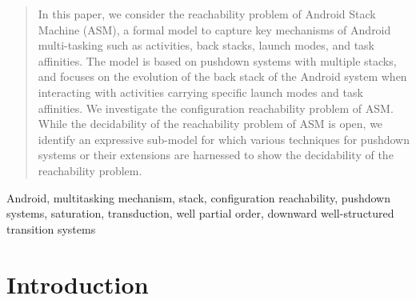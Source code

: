 \documentclass[preprint,12pt]{elsarticle}
\begin{document}
\begin{frontmatter}





 
\begin{abstract}
In this paper, we consider the reachability problem of Android Stack Machine (ASM), a formal model to capture key mechanisms of Android multi-tasking such as activities, back stacks, launch modes, and task affinities. The model is based on pushdown systems with multiple stacks, and focuses on the evolution of the back stack of the Android system when interacting with activities carrying specific launch modes and task affinities. We investigate the configuration reachability problem of ASM. While the decidability of the reachability problem of ASM is open, we identify an expressive sub-model for which various techniques for pushdown systems or their extensions are harnessed to show the decidability of the reachability problem.
\end{abstract}



\begin{keyword}
Android, multitasking mechanism, stack, configuration reachability, pushdown systems, saturation, transduction, well partial order, downward well-structured transition systems
\end{keyword}
\end{frontmatter}



\section{Introduction} \label{sec:intro}

\end{document}

